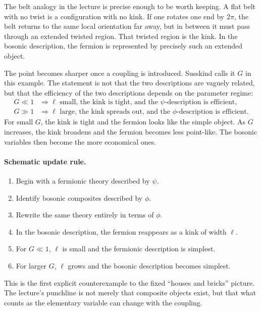The belt analogy in the lecture is precise enough to be worth keeping. A flat belt with no twist is a configuration with no kink. If one rotates one end by \(2\pi\), the belt returns to the same local orientation far away, but in between it must pass through an extended twisted region. That twisted region is the kink. In the bosonic description, the fermion is represented by precisely such an extended object.

The point becomes sharper once a coupling is introduced. Susskind calls it \(G\) in this example. The statement is not that the two descriptions are vaguely related, but that the efficiency of the two descriptions depends on the parameter regime:
\begin{align}
G \ll 1
&\Rightarrow
\ell \text{ small, the kink is tight, and the }\psi\text{-description is efficient},\\
G \gg 1
&\Rightarrow
\ell \text{ large, the kink spreads out, and the }\phi\text{-description is efficient}.
\end{align}
For small \(G\), the kink is tight and the fermion looks like the simple object. As \(G\) increases, the kink broadens and the fermion becomes less point-like. The bosonic variables then become the more economical ones.

\paragraph{Schematic update rule.}
\begin{enumerate}
\item Begin with a fermionic theory described by \(\psi\).
\item Identify bosonic composites described by \(\phi\).
\item Rewrite the same theory entirely in terms of \(\phi\).
\item In the bosonic description, the fermion reappears as a kink of width \(\ell\).
\item For \(G\ll 1\), \(\ell\) is small and the fermionic description is simplest.
\item For larger \(G\), \(\ell\) grows and the bosonic description becomes simplest.
\end{enumerate}

This is the first explicit counterexample to the fixed ``houses and bricks'' picture. The lecture's punchline is not merely that composite objects exist, but that what counts as the elementary variable can change with the coupling.


